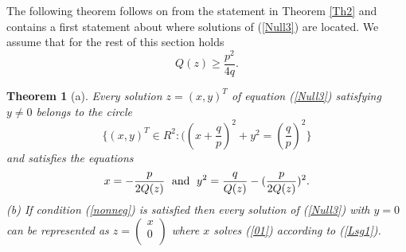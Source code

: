 \documentclass{amsart}
\newtheorem{thm}{Theorem}[section]
\theoremstyle{definition}
\theoremstyle{remark}
\numberwithin{equation}{section}
\begin{document}
The following theorem follows on from the statement in Theorem \ref{Th2} and contains a first statement about where solutions of (\ref{Null3})
are located.
We assume that for the rest of this section holds
\[Q(z)\geq\frac{p^2}{4q}.\]
\begin{thm}[a]
Every solution $z=(x,y)^T$ of equation (\ref{Null3}) satisfying $y\neq 0$ belongs to the circle
\[\{(x,y)^T\in R^2:((x+\frac{q}{p})^2+y^2=(\frac{q}{p})^2\}\]
and satisfies the equations
\[x=-\frac{p}{2Q(z)}\text{\; and \;} y^2=\frac{q}{Q(z)}-(\frac{p}{2Q(z)})^2.\]
(b) If condition (\ref{nonneg}) is satisfied then every solution of (\ref{Null3}) with $y=0$ can be represented as $z=\left(
        \begin{array}{c}
          x \\
          0 \\
        \end{array}
      \right)
$ where $x$ solves (\ref{01}) according to (\ref{Lsg1}).
\end{thm}
\end{document}
